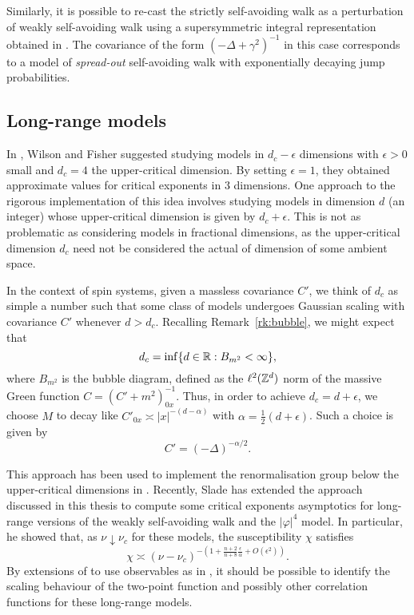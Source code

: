 \begin{rk}
Similarly, it is possible to re-cast the strictly self-avoiding walk as a
perturbation of weakly self-avoiding walk using a supersymmetric integral
representation obtained in \cite{BIS09}. The covariance of the form
$(-\Delta + \gamma^2)^{-1}$ in this case corresponds to a model of \emph{spread-out}
self-avoiding walk with exponentially decaying jump probabilities.
\end{rk}


\subsection{Long-range models}

In \cite{WF72}, Wilson and Fisher suggested studying models in $d_c - \epsilon$
dimensions with $\epsilon > 0$ small and $d_c = 4$ the upper-critical dimension.
By setting $\epsilon = 1$, they obtained approximate values for critical exponents
in $3$ dimensions. One approach to the rigorous implementation of this idea
involves studying models in dimension $d$ (an integer) whose upper-critical
dimension is given by $d_c + \epsilon$. This is not as problematic as considering
models in fractional dimensions, as the upper-critical dimension $d_c$ need not
be considered the actual of dimension of some ambient space.

In the context of spin systems, given a massless covariance $C'$, we think of $d_c$
as simple a number such that some class of models undergoes Gaussian scaling with
covariance $C'$ whenever $d > d_c$. Recalling Remark~\ref{rk:bubble}, we might
expect that
\begin{equation}
d_c = \inf \{ d \in {\mathbb R} : B_{m^2} < \infty \},
\end{equation}
where $B_{m^2}$ is the bubble diagram, defined as the $\ell^2({ {{\mathbb Z}}^d })$ norm of the
massive Green function $C = (C' + m^2)^{-1}_{0x}$. Thus, in order to achieve
$d_c = d + \epsilon$, we choose $M$ to decay like $C'_{0x} \asymp |x|^{-(d-\alpha)}$
with $\alpha = \tfrac12 (d + \epsilon)$. Such a choice is given by
\begin{equation}
C' = (-\Delta)^{-\alpha/2}.
\end{equation}

This approach has been used to implement the renormalisation group below the
upper-critical dimensions in \cite{BDH98,MS00,BMS03,Abde07}. Recently, Slade
\cite{Slad17} has extended the approach discussed in this thesis to compute
some critical exponents asymptotics for long-range versions of the weakly
self-avoiding walk and the $|\varphi|^4$ model. In particular, he showed that,
as $\nu\downarrow\nu_c$ for these models, the susceptibility $\chi$ satisfies
\begin{equation}
\chi
	\asymp
(\nu - \nu_c)^{-\left(1 + \tfrac{n+2}{n+8} \tfrac{\epsilon}{\alpha} + O(\epsilon^2)\right)}.
\end{equation}
By extensions of \cite{Slad17} to use observables as in \REF, it should be
possible to identify the scaling behaviour of the two-point function and possibly
other correlation functions for these long-range models.

